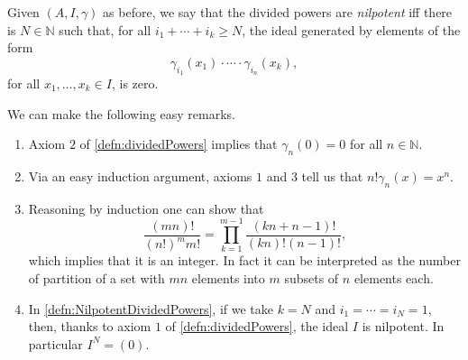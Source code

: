 \begin{defn}\label{defn:NilpotentDividedPowers}
	Given $\left(A, I, \gamma\right)$ as before, we say that the divided
	powers are {\em nilpotent} iff there is $N \in \mathbb{N}$ such that,
	for all $i_1 + \cdots + i_k \geq N$,
	the ideal generated by elements of the form
	\begin{equation*}
		\gamma_{i_1}(x_1) \cdot \cdots \cdot \gamma_{i_n}(x_k)
	,\end{equation*}
	for all $x_1, \ldots, x_k \in I$,
	is zero.
\end{defn}


\begin{rem}[]
	We can make the following easy remarks.
\begin{enumerate}
\item Axiom $2$ of \cref{defn:dividedPowers}
	implies that $\gamma_n(0) = 0$ for all $n \in \mathbb{N}$.

\item Via an easy induction argument, axioms $1$ and $3$ tell us that
	$n! \gamma_n(x) = x^n$.

\item Reasoning by induction one can show that
	\begin{equation*}
		\frac{\left( mn \right)!}{\left( n! \right)^m m!} =
		\prod_{k=1}^{m-1} \frac{\left( kn + n - 1 \right)!}{(kn)! (n-1)!}
	,\end{equation*}
	which implies that it is an integer.
	In fact it can be interpreted as the number of partition of a set with $mn$
	elements into $m$ subsets of $n$ elements each.

\item In \cref{defn:NilpotentDividedPowers},
	if we take $k = N$ and $i_1 = \cdots = i_N = 1$,
	then, thanks to axiom $1$ of \cref{defn:dividedPowers}, the ideal $I$
	is nilpotent.
	In particular $I^N = (0)$.
\end{enumerate}
\end{rem}


